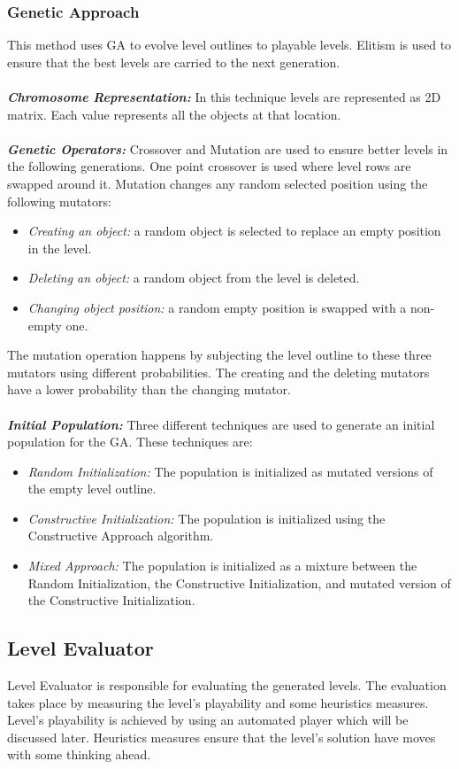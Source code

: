 \documentclass[letterpaper]{article}
\begin{document}
\subsubsection{Genetic Approach}
This method uses GA to evolve level outlines to playable levels. Elitism is used to ensure that the best levels are carried to the next generation.\\\\
\emph{\textbf{Chromosome Representation:}} In this technique levels are represented as 2D matrix. Each value represents all the objects at that location.\\\\
\emph{\textbf{Genetic Operators:}} Crossover and Mutation are used to ensure better levels in the following generations. One point crossover is used where level rows are swapped around it. Mutation changes any random selected position using the following mutators:
\begin{itemize}
	\item \emph{Creating an object:} a random object is selected to replace an empty position in the level.
	\item \emph{Deleting an object:} a random object from the level is deleted.
	\item \emph{Changing object position:} a random empty position is swapped with a non-empty one.
\end{itemize}
The mutation operation happens by subjecting the level outline to these three mutators using different probabilities. The creating and the deleting mutators have a lower probability than the changing mutator.\\\\
\emph{\textbf{Initial Population:}} Three different techniques are used to generate an initial population for the GA. These techniques are:
\begin{itemize}
	\item \emph{Random Initialization:} The population is initialized as mutated versions of the empty level outline.
	\item \emph{Constructive Initialization:} The population is initialized using the Constructive Approach algorithm.
	\item \emph{Mixed Approach:} The population is initialized as a mixture between the Random Initialization, the Constructive Initialization, and mutated version of the Constructive Initialization.
\end{itemize}

\subsection{Level Evaluator}
Level Evaluator is responsible for evaluating the generated levels. The evaluation takes place by measuring the level's playability and some heuristics measures. Level's playability is achieved by using an automated player which will be discussed later. Heuristics measures ensure that the level's solution have moves with some thinking ahead.
\end{document}
